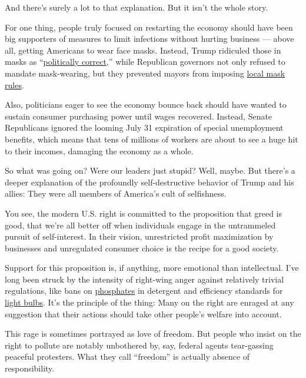 And there's surely a lot to that explanation. But it isn't the whole
story.

For one thing, people truly focused on restarting the economy should
have been big supporters of measures to limit infections without hurting
business --- above all, getting Americans to wear face masks. Instead,
Trump ridiculed those in masks as
``\href{https://www.cbsnews.com/video/trump-mocks-those-wearing-face-masks-calling-it-politically-correct/}{politically
correct},'' while Republican governors not only refused to mandate
mask-wearing, but they prevented mayors from imposing
\href{https://www.cbsnews.com/news/georgia-governor-brian-kemp-bans-city-face-mask-orders-coronavirus-pandemic/}{local
mask rules}.

Also, politicians eager to see the economy bounce back should have
wanted to sustain consumer purchasing power until wages recovered.
Instead, Senate Republicans ignored the looming July 31 expiration of
special unemployment benefits, which means that tens of millions of
workers are about to see a huge hit to their incomes, damaging the
economy as a whole.

So what was going on? Were our leaders just stupid? Well, maybe. But
there's a deeper explanation of the profoundly self-destructive behavior
of Trump and his allies: They were all members of America's cult of
selfishness.

You see, the modern U.S. right is committed to the proposition that
greed is good, that we're all better off when individuals engage in the
untrammeled pursuit of self-interest. In their vision, unrestricted
profit maximization by businesses and unregulated consumer choice is the
recipe for a good society.

Support for this proposition is, if anything, more emotional than
intellectual. I've long been struck by the intensity of right-wing anger
against relatively trivial regulations, like bans on
\href{https://krugman.blogs.nytimes3xbfgragh.onion/2014/08/05/phosphate-memories/}{phosphates}
in detergent and efficiency standards for
\href{https://www.desmogblog.com/light-bulb-madness-new-case-study-right-wing-misinformation}{light
bulbs}. It's the principle of the thing: Many on the right are enraged
at any suggestion that their actions should take other people's welfare
into account.

This rage is sometimes portrayed as love of freedom. But people who
insist on the right to pollute are notably unbothered by, say, federal
agents tear-gassing peaceful protesters. What they call ``freedom'' is
actually absence of responsibility.

